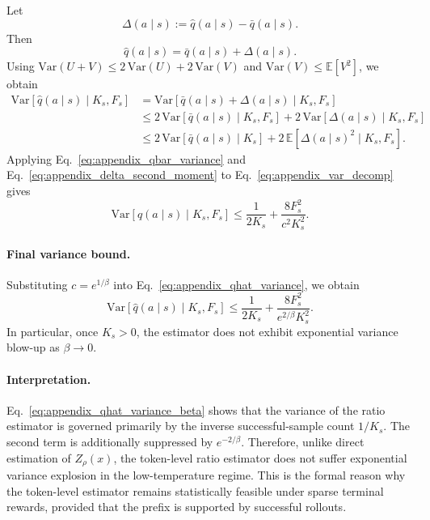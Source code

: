 \documentclass{article}
\begin{document}
Let
\begin{equation}
\Delta(a \mid s)
:=
\widehat q(a \mid s)-\bar q(a \mid s).
\end{equation}
Then
\begin{equation}
\widehat q(a \mid s)=\bar q(a \mid s)+\Delta(a \mid s).
\end{equation}
Using $\mathrm{Var}(U+V)\le 2\,\mathrm{Var}(U)+2\,\mathrm{Var}(V)$ and $\mathrm{Var}(V)\le \mathbb{E}[V^2]$, we obtain
\begin{align}
\mathrm{Var}\!\left[\widehat q(a \mid s)\mid K_s,F_s\right]
&=
\mathrm{Var}\!\left[\bar q(a \mid s)+\Delta(a \mid s)\mid K_s,F_s\right]
\nonumber\\
&\le
2\,\mathrm{Var}\!\left[\bar q(a \mid s)\mid K_s,F_s\right]
+
2\,\mathrm{Var}\!\left[\Delta(a \mid s)\mid K_s,F_s\right]
\nonumber\\
&\le
2\,\mathrm{Var}\!\left[\bar q(a \mid s)\mid K_s\right]
+
2\,\mathbb{E}\!\left[\Delta(a \mid s)^2 \mid K_s,F_s\right].
\label{eq:appendix_var_decomp}
\end{align}
Applying Eq.~\eqref{eq:appendix_qbar_variance} and Eq.~\eqref{eq:appendix_delta_second_moment} to Eq.~\eqref{eq:appendix_var_decomp} gives
\begin{equation}
\mathrm{Var}\!\left[\widehat q(a \mid s)\mid K_s,F_s\right]
\le
\frac{1}{2K_s}
+
\frac{8F_s^2}{c^2K_s^2}.
\label{eq:appendix_qhat_variance}
\end{equation}

\paragraph{Final variance bound.}
Substituting $c=e^{1/\beta}$ into Eq.~\eqref{eq:appendix_qhat_variance}, we obtain
\begin{equation}
\mathrm{Var}\!\left[\widehat q(a \mid s)\mid K_s,F_s\right]
\le
\frac{1}{2K_s}
+
\frac{8F_s^2}{e^{2/\beta}K_s^2}.
\label{eq:appendix_qhat_variance_beta}
\end{equation}
In particular, once $K_s>0$, the estimator does not exhibit exponential variance blow-up as $\beta\to 0$.

\paragraph{Interpretation.}
Eq.~\eqref{eq:appendix_qhat_variance_beta} shows that the variance of the ratio estimator is governed primarily by the inverse successful-sample count $1/K_s$. The second term is additionally suppressed by $e^{-2/\beta}$. Therefore, unlike direct estimation of $Z_\rho(x)$, the token-level ratio estimator does not suffer exponential variance explosion in the low-temperature regime. This is the formal reason why the token-level estimator remains statistically feasible under sparse terminal rewards, provided that the prefix is supported by successful rollouts.
\end{document}
